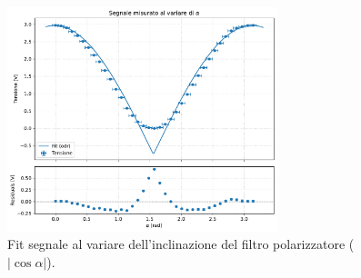 \documentclass[a4paper]{article}
\begin{document}
\begin{figure}[htbp]
	\centering
	\includegraphics[width=0.7\textwidth]{grafici/abs_cos.pdf}
	\caption{Fit segnale al variare dell'inclinazione del filtro polarizzatore ($|\cos \alpha|$).}
	\label{fig:modulo_coseno}
\end{figure}
\end{document}
